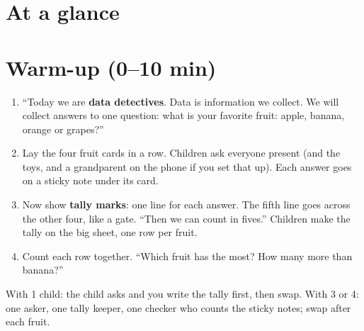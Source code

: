 \section{At a glance}
\begin{timeplan}
\end{timeplan}

\section{Warm-up (0--10 min)}
\begin{unplugged}
\begin{enumerate}[leftmargin=1.4em,itemsep=1pt]
  \item \enquote{Today we are \textbf{data detectives}. Data is information we collect. We will collect answers to one question: what is your favorite fruit: apple, banana, orange or grapes?}
  \item Lay the four fruit cards in a row. Children ask everyone present (and the toys, and a grandparent on the phone if you set that up). Each answer goes on a sticky note under its card.
  \item Now show \textbf{tally marks}: one line for each answer. The fifth line goes across the other four, like a gate. \enquote{Then we can count in fives.} Children make the tally on the big sheet, one row per fruit.
  \item Count each row together. \enquote{Which fruit has the most? How many more than banana?}
\end{enumerate}
With 1 child: the child asks and you write the tally first, then swap. With 3 or 4: one asker, one tally keeper, one checker who counts the sticky notes; swap after each fruit.
\end{unplugged}

